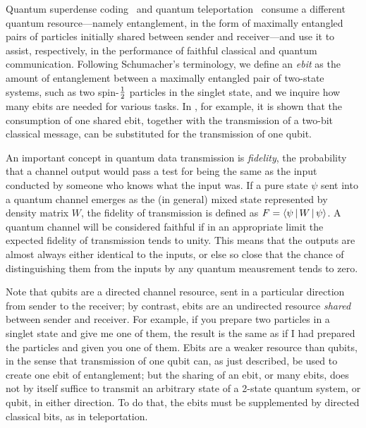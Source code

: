 Quantum superdense coding~\cite{BW92} and
quantum teleportation~\cite{BBCJPW93} consume a different quantum
resource---namely entanglement, in the form of maximally
entangled pairs of particles initially shared between sender and
receiver---and use it to assist, respectively, in the performance
of faithful classical and quantum communication.  Following
Schumacher's terminology, we define an {\em ebit\/} as the amount
of entanglement between a maximally entangled pair of two-state
systems, such as two spin-$\mbox{$\textstyle \frac{1}{2}$}$ particles in the singlet state,
and we inquire how many ebits are needed for various tasks.
In \cite{BBCJPW93}, for example, it is shown that the consumption
of one shared ebit, together with the transmission of a two-bit
classical message, can be substituted for the transmission of one
qubit.
 
An important concept in quantum data transmission is {\sl fidelity\/},
the probability that a channel output would pass a test for being the
same as the input conducted by someone who knows what the input was.
If a pure state $\psi$ sent into a quantum channel emerges as the
(in general) mixed state represented by density matrix $W$, the fidelity
of transmission is defined
as $F=\left \langle \psi \, \right |W\left | \, \psi \right \rangle$.  A quantum channel will be
considered faithful if in an appropriate limit the expected fidelity
of transmission tends to unity.  This means that the outputs are almost
always either identical to the inputs, or else so close that the
chance of distinguishing them from the inputs by any quantum meausrement
tends to zero.
 
Note that qubits are a directed channel resource, sent in a
particular direction from sender to the receiver; by contrast,
ebits are an undirected resource {\em shared \/} between sender
and receiver.  For example, if you prepare two particles in a
singlet state and give me one of them, the result is the same as
if I had prepared the particles and given you one of them.  Ebits
are a weaker resource than qubits, in the sense that transmission
of one qubit can, as just described, be used to create one ebit
of entanglement; but the sharing of an ebit, or many ebits, does
not by itself suffice to transmit an arbitrary state of a 2-state
quantum system, or qubit, in either direction.  To do that, the
ebits must be supplemented by directed classical bits, as in
teleportation.
 
